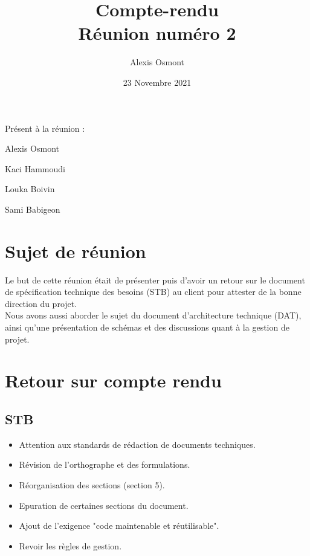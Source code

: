 \documentclass{article}
\title{
    \Huge
    Compte-rendu\\
    Réunion numéro 2\\
}
\date{\huge 23 Novembre 2021}
\author{\huge Alexis Osmont\\}
\begin{document}
\maketitle
\vspace{5cm}
    Présent à la réunion :
    \begin{description}
        \item Alexis Osmont
        \item Kaci Hammoudi
        \item Louka  Boivin
        \item Sami Babigeon
    \end{description}
\newpage

\section{Sujet de réunion}                                                                                 

Le but de cette réunion était de présenter puis d'avoir un retour sur le document de spécification technique des besoins (STB) au client pour attester de la bonne direction du projet.\\

Nous avons aussi aborder le sujet du document d'architecture technique (DAT), ainsi qu'une présentation de schémas et des discussions quant à la gestion de projet.
\vspace{0.5cm}

\section{Retour sur compte rendu}
\subsection{STB}

\begin{itemize}
    \item Attention aux standards de rédaction de documents techniques.
    \item Révision de l'orthographe et des formulations.
    \item Réorganisation des sections (section 5).
    \item Epuration de certaines sections du document.
    \item Ajout de l'exigence "code maintenable et réutilisable".
    \item Revoir les règles de gestion.
\end{itemize}
\end{document}
